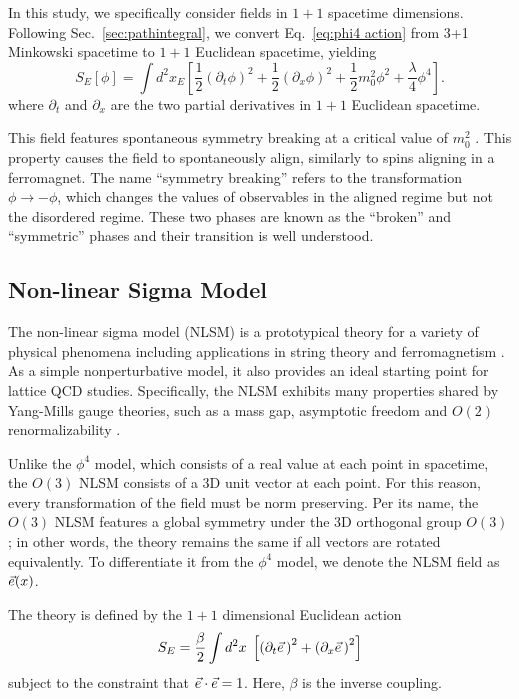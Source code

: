 In this study, we specifically consider fields in $1+1$ spacetime dimensions. Following Sec.~\ref{sec:pathintegral}, we convert Eq.~\ref{eq:phi4 action} from 3+1 Minkowski spacetime to $1+1$ Euclidean spacetime, yielding
\begin{equation}
    \label{eq:phi4 euclidean action}
    S_E[\phi] = \int d^2 x_E \left[\frac{1}{2}\left(\partial_t \phi\right)^2 + \frac{1}{2} \left(\partial_x \phi \right)^2 + \frac{1}{2} m_0^2 \phi^2 + \frac{\lambda}{4}\phi^4\right].
\end{equation}
where $\partial_t$ and $\partial_x$ are the two partial derivatives in $1+1$ Euclidean spacetime. 

This field features spontaneous symmetry breaking at a critical value of $m_0^2$ \cite{chang1976}. This property causes the field to spontaneously align, similarly to spins aligning in a ferromagnet. The name ``symmetry breaking'' refers to the transformation $\phi\rightarrow-\phi$, which changes the values of observables in the aligned regime but not the disordered regime. These two phases are known as the ``broken'' and ``symmetric'' phases and their transition is well understood.


\subsection{Non-linear Sigma Model}
The non-linear sigma model (NLSM) is a prototypical theory for a variety of physical phenomena including applications in string theory \cite{callan1985} and ferromagnetism \cite{polyakov1975}. As a simple nonperturbative model, it also provides an ideal starting point for lattice QCD studies. Specifically, the NLSM exhibits many properties shared by Yang-Mills gauge theories, such as a mass gap, asymptotic freedom and $O(2)$ renormalizability \cite{polyakov1975}. 

Unlike the $\phi^4$ model, which consists of a real value at each point in spacetime, the $O(3)$ NLSM consists of a 3D unit vector at each point. For this reason, every transformation of the field must be norm preserving. Per its name, the $O(3)$ NLSM features a global symmetry under the 3D orthogonal group $O(3)$; in other words, the theory remains the same if all vectors are rotated equivalently. To differentiate it from the $\phi^4$ model, we denote the NLSM field as $\vec e(x)$.

The theory is defined by the $1+1$ dimensional Euclidean action 
\begin{equation}
    \label{eq:nlsm euclidean action}
    S_E = \frac{\beta}{2} \int d^2x \; \left[ \left(\partial_t \vec e\, \right)^2+ \left( \partial_x \vec e\,\right)^2 \right]
\end{equation}
subject to the constraint that $\vec e\cdot\vec e = 1$. Here, $\beta$ is the inverse coupling.


